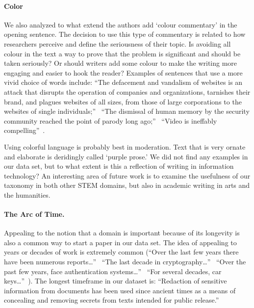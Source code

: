 \documentclass[sigconf,anonymous]{acmart}
\begin{document}
	\paragraph{Color} We also analyzed to what extend the authors add `colour commentary' in the opening sentence. The decision to use this type of commentary is related to how researchers perceive and define the seriousness of their topic. Is avoiding all colour in the text a way to prove that the problem is significant and should be taken seriously? Or should writers add some colour to make the writing more engaging and easier to hook the reader? Examples of sentences that use a more vivid choice of words include: ``The defacement and vandalism of websites is an attack that disrupts the operation of companies and organizations, tarnishes their brand, and plagues websites of all sizes, from those of large corporations to the websites of single individuals;''~\cite{borgolte2015meerkat} ``The dismissal of human memory by the security community reached the point of parody long ago;''~\cite{bonneau2014towards} ``Video is ineffably compelling''~\cite{brocker2014iseeyou}.

	Using colorful language is probably best in moderation. Text that is very ornate and elaborate is deridingly called `purple prose.' We did not find any examples in our data set, but to what extent is this a reflection of writing in information technology? An interesting area of future work is to examine the usefulness of our taxonomy in both other STEM domains, but also in academic writing in arts and the humanities.

	\paragraph{The Arc of Time.} Appealing to the notion that a domain is important because of its longevity is also a common way to start a paper in our data set. The idea of appealing to years or decades of work is extremely common (``Over the last few years there have been numerous reports…''~\cite{nakibly2016website} ``The last decade in cryptography…''~\cite{alkim2016post} ``Over the past few years, face authentication systems…''~\cite{xu2016virtual} ``For several decades, car keys…''~\cite{garcia2016lock}). The longest timeframe in our dataset is: ``Redaction of sensitive information from documents has been used since ancient times as a means of concealing and removing secrets from texts intended for public release.''~\cite{araujo2015compiler}
\end{document}
